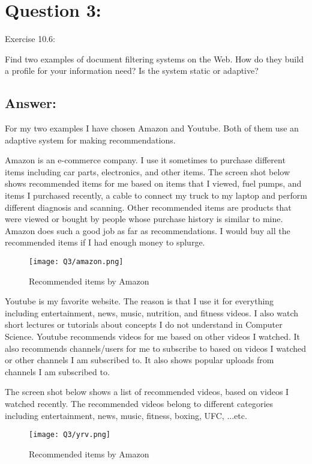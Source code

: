 \section*{Question 3:}
Exercise 10.6: 

Find two examples of document filtering systems on the Web. How do they build a profile for your information need? Is the system static or adaptive?


\subsection*{Answer:}

For my two examples I have chosen Amazon and Youtube. Both of them use an adaptive system for making recommendations. 

Amazon is an e-commerce company. I use it sometimes to purchase different items including car parts, electronics, and other items. The screen shot below shows recommended items for me based on items that I viewed, fuel pumps, and items I purchased recently, a cable to connect my truck to my laptop and perform different diagnosis and scanning. Other recommended items are products that were viewed or bought by people whose purchase history is similar to mine. Amazon does such a good job as far as recommendations. I would buy all the recommended items if I had enough money to splurge. 

\begin{figure}[h]
\caption{Recommended items by Amazon}
\centering
\texttt{[image: Q3/amazon.png]}
\end{figure}

\pagebreak

Youtube is my favorite website. The reason is that I use it for everything including entertainment, news, music, nutrition, and fitness videos. I also watch short lectures or tutorials about concepts I do not understand in Computer Science. Youtube recommends videos for me based on other videos I watched. It also recommends channels/users for me to subscribe to based on videos I watched or other channels I am subscribed to. It also shows popular uploads from channels I am subscribed to.

The screen shot below shows a list of recommended videos, based on videos I watched recently. The recommended videos belong to different categories including entertainment, news, music, fitness, boxing, UFC, ...etc.

\begin{figure}[h]
\caption{Recommended items by Amazon}
\centering
\texttt{[image: Q3/yrv.png]}
\end{figure}

